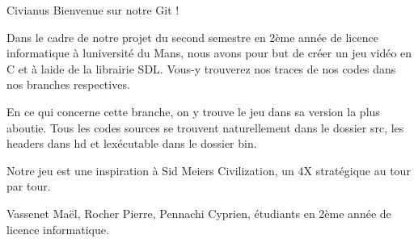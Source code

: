 Civianus Bienvenue sur notre Git !

Dans le cadre de notre projet du second semestre en 2ème année de licence informatique à l\textquotesingle{}université du Mans, nous avons pour but de créer un jeu vidéo en C et à l\textquotesingle{}aide de la librairie SDL. Vous-\/y trouverez nos traces de nos codes dans nos branches respectives.

En ce qui concerne cette branche, on y trouve le jeu dans sa version la plus aboutie. Tous les codes sources se trouvent naturellement dans le dossier \textquotesingle{}src\textquotesingle{}, les headers dans \textquotesingle{}hd\textquotesingle{} et l\textquotesingle{}exécutable dans le dossier \textquotesingle{}bin\textquotesingle{}.

Notre jeu est une inspiration à Sid Meier\textquotesingle{}s Civilization, un 4X stratégique au tour par tour.

Vassenet Maël, Rocher Pierre, Pennachi Cyprien, étudiants en 2ème année de licence informatique. 